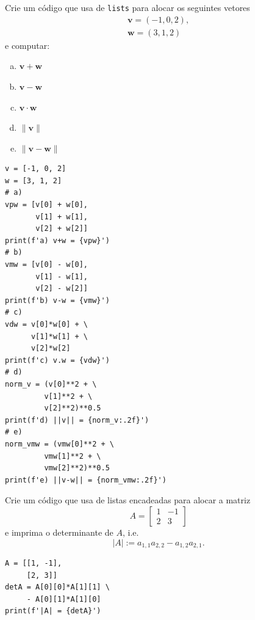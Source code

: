 \begin{exer}
  Crie um código que usa de \texttt{lists} para alocar os seguintes vetores
  \begin{align}
    \pmb{v} = (-1, 0, 2),\\
    \pmb{w} = (3, 1, 2)
  \end{align}
  e computar:
  \begin{enumerate}[a)]
  \item $\pmb{v} + \pmb{w}$\\
  \item $\pmb{v} - \pmb{w}$\\
  \item $\pmb{v}\cdot \pmb{w}$\\
  \item $\|\pmb{v}\|$\\
  \item $\|\pmb{v} - \pmb{w}\|$
  \end{enumerate}
\end{exer}
\begin{resp}

\begin{lstlisting}
v = [-1, 0, 2]
w = [3, 1, 2]
# a)
vpw = [v[0] + w[0],
       v[1] + w[1],
       v[2] + w[2]]
print(f'a) v+w = {vpw}')
# b)
vmw = [v[0] - w[0],
       v[1] - w[1],
       v[2] - w[2]]
print(f'b) v-w = {vmw}')
# c)
vdw = v[0]*w[0] + \
      v[1]*w[1] + \
      v[2]*w[2]
print(f'c) v.w = {vdw}')
# d)
norm_v = (v[0]**2 + \
         v[1]**2 + \
         v[2]**2)**0.5
print(f'd) ||v|| = {norm_v:.2f}')
# e)
norm_vmw = (vmw[0]**2 + \
         vmw[1]**2 + \
         vmw[2]**2)**0.5
print(f'e) ||v-w|| = {norm_vmw:.2f}')
\end{lstlisting}

\end{resp}

\begin{exer}
  Crie um código que usa de listas encadeadas para alocar a matriz
  \begin{equation}
    A =
    \begin{bmatrix}
      1 & -1\\
      2 & 3
    \end{bmatrix}
  \end{equation}
  e imprima o determinante de $A$, i.e.
  \begin{equation}
    |A| := a_{1,1}a_{2,2} - a_{1,2}a_{2,1}.
  \end{equation}
\end{exer}
\begin{resp}

\begin{lstlisting}
A = [[1, -1],
     [2, 3]]
detA = A[0][0]*A[1][1] \
     - A[0][1]*A[1][0]
print(f'|A| = {detA}')
\end{lstlisting}

\end{resp}

